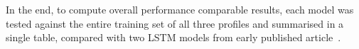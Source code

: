 {In the end, to compute overall performance comparable results, each model was tested against the entire training set of all three profiles and summarised in a single table, compared with two LSTM models from early published article~\cite{sadykov_practical_2022}.}
